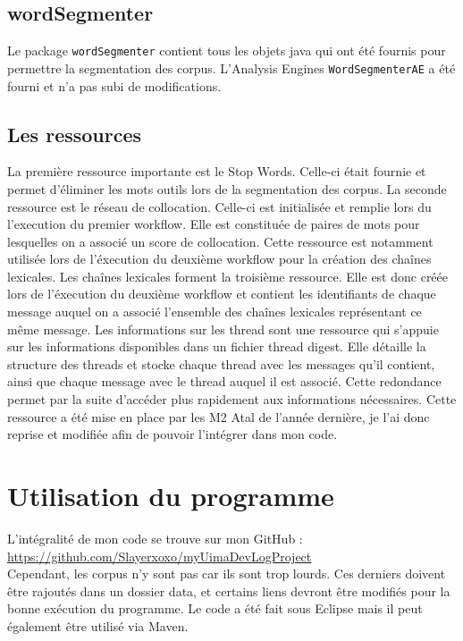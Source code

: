 \documentclass[a4paper]{article}
\begin{document}
	\subsection{wordSegmenter}
	Le package \texttt{wordSegmenter} contient tous les objets java qui ont été fournis pour permettre la segmentation des corpus. L'Analysis Engines \texttt{WordSegmenterAE} a été fourni et n'a pas subi de modifications.

	\subsection{Les ressources}
	La première ressource importante est le Stop Words. Celle-ci était fournie et permet d'éliminer les mots outils lors de la segmentation des corpus. 
La seconde ressource est le réseau de collocation. Celle-ci est initialisée et remplie lors du l'execution du premier workflow. Elle est constituée de paires de mots pour lesquelles on a associé un score de collocation. Cette ressource est notamment utilisée lors de l'éxecution du deuxième workflow pour la création des chaînes lexicales. 
Les chaînes lexicales forment la troisième ressource. Elle est donc créée lors de l'éxecution du deuxième workflow et contient les identifiants de chaque message auquel on a associé l'ensemble des chaînes lexicales représentant ce même message. 
Les informations sur les thread sont une ressource qui s’appuie sur les informations disponibles dans un fichier thread digest. Elle détaille la structure des threads et stocke chaque thread avec les messages qu’il contient, ainsi que chaque message avec le thread auquel il est associé. Cette redondance permet par la suite d’accéder plus rapidement aux informations nécessaires. Cette ressource a été mise en place par les M2 Atal de l'année dernière, je l'ai donc reprise et modifiée afin de pouvoir l'intégrer dans mon code.
	
	
	\section{Utilisation du programme}

	L'intégralité de mon code se trouve sur mon GitHub : \url{https://github.com/Slayerxoxo/myUimaDevLogProject}\\
	
Cependant, les corpus n'y sont pas car ils sont trop lourds. Ces derniers doivent être rajoutés dans un dossier data, et certains liens devront être modifiés pour la bonne exécution du programme. Le code a été fait sous Eclipse mais il peut également être utilisé via Maven. 
\end{document}
